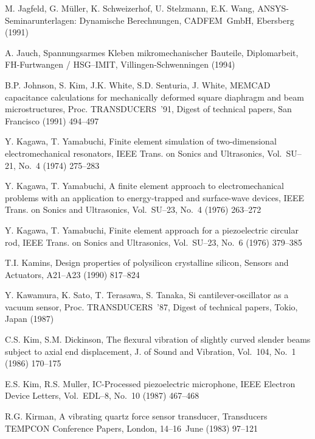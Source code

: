 \begin{thebibliography}{xxx}
 M. Jagfeld, G. Müller, K. Schweizerhof, U. Stelzmann, E.K. Wang,
 {\sf ANSYS}-Seminarunterlagen: Dynamische Berechnungen, CADFEM~GmbH,
 Ebersberg (1991)

 A. Jauch, Spannungsarmes Kleben mikromechanischer Bauteile, Diplomarbeit,
 FH-Furtwangen / HSG--IMIT, Villingen-Schwenningen (1994)

 B.P. Johnson, S. Kim, J.K. White, S.D. Senturia, J. White, {\sf MEMCAD}
 capacitance calculations for mechanically deformed square diaphragm and
 beam microstructures, Proc. TRANSDUCERS~'91, Digest of technical papers,
 San Francisco (1991) 494--497

 Y. Kagawa, T. Yamabuchi, Finite element simulation of two-dimensional
 electromechanical resonators, IEEE Trans. on Sonics and Ultrasonics,
 Vol.~SU--21, No.~4 (1974) 275--283

 Y. Kagawa, T. Yamabuchi, A finite element approach to electromechanical
 problems with an application to energy-trapped and surface-wave devices,
 IEEE Trans. on Sonics and Ultrasonics, Vol.~SU--23, No.~4 (1976) 263--272

 Y. Kagawa, T. Yamabuchi, Finite element approach for a piezoelectric
 circular rod, IEEE Trans. on Sonics and Ultrasonics, Vol.~SU--23, No.~6
 (1976) 379--385

 T.I. Kamins, Design properties of polysilicon crystalline silicon,
 Sensors and Actuators, A21--A23 (1990) 817--824

 Y. Kawamura, K. Sato, T. Terasawa, S. Tanaka, Si cantilever-oscillator as
 a vacuum sensor, Proc. TRANSDUCERS~'87, Digest of technical papers, Tokio,
 Japan (1987)

 C.S. Kim, S.M. Dickinson, The flexural vibration of slightly curved slender
 beams subject to axial end displacement, J. of Sound and Vibration,
 Vol.~104, No.~1 (1986) 170--175

 E.S. Kim, R.S. Muller, IC-Processed piezoelectric microphone, IEEE Electron
 Device Letters, Vol.~EDL--8, No.~10 (1987) 467--468

 R.G. Kirman, A vibrating quartz force sensor transducer, Transducers
 TEMPCON Conference Papers, London, 14--16~June (1983) 97--121


\end{thebibliography}
